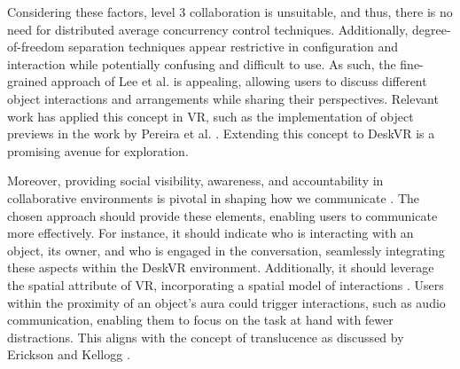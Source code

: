     Considering these factors, level 3 collaboration is unsuitable, and thus, there is no need for distributed average concurrency control techniques. Additionally, degree-of-freedom separation techniques appear restrictive in configuration and interaction while potentially confusing and difficult to use. As such, the fine-grained approach of Lee et al. \cite{leeSupportingFineGrainedConcurrent2012} is appealing, allowing users to discuss different object interactions and arrangements while sharing their perspectives. Relevant work has applied this concept in VR, such as the implementation of object previews in the work by Pereira et al. \cite{pereiraExtendedRealityFramework2019}. Extending this concept to DeskVR is a promising avenue for exploration.

    Moreover, providing social visibility, awareness, and accountability in collaborative environments is pivotal in shaping how we communicate \cite{ericksonSocialTranslucenceApproach2000, gutwinDescriptiveFrameworkWorkspace2002}. The chosen approach should provide these elements, enabling users to communicate more effectively. For instance, it should indicate who is interacting with an object, its owner, and who is engaged in the conversation, seamlessly integrating these aspects within the DeskVR environment. Additionally, it should leverage the spatial attribute of VR, incorporating a spatial model of interactions \cite{benfordSpatialModelInteraction1993, dominguesCollaborative3DInteraction2011}. Users within the proximity of an object's aura could trigger interactions, such as audio communication, enabling them to focus on the task at hand with fewer distractions. This aligns with the concept of translucence as discussed by Erickson and Kellogg \cite{ericksonSocialTranslucenceApproach2000}.



